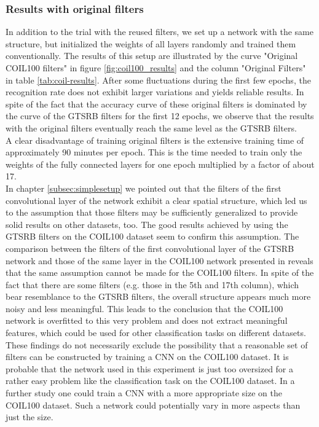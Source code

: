 \documentclass[11pt, a4paper]{article}
\begin{document}
\subsubsection{Results with original filters}

In addition to the trial with the reused filters, we set up a network with the same structure, but initialized the weights of all layers randomly and trained them conventionally. The results of this setup are illustrated by the curve "Original COIL100 filters" in figure \ref{fig:coil100_results} and the column "Original Filters" in table \ref{tab:coil-results}. After some fluctuations during the first few epochs, the recognition rate does not exhibit larger variations and yields reliable results. In spite of the fact that the accuracy curve of these original filters is dominated by the curve of the GTSRB filters for the first 12 epochs, we observe that the results with the original filters eventually reach the same level as the GTSRB filters.\\
A clear disadvantage of training original filters is the extensive training time of approximately 90 minutes per epoch. This is the time needed to train only the weights of the fully connected layers for one epoch multiplied by a factor of about 17.\\
In chapter \ref{subsec:simplesetup} we pointed out that the filters of the first convolutional layer of the  network exhibit a clear spatial structure, which led us to the assumption that those filters may be sufficiently generalized to provide solid results on other datasets, too. The good results achieved by using the GTSRB filters on the COIL100 dataset seem to confirm this assumption. The comparison between the filters of the first convolutional layer of the GTSRB network and those of the same layer in the COIL100 network presented in  reveals that the same assumption cannot be made for the COIL100 filters. In spite of the fact that there are some filters (e.g. those in the 5th and 17th column), which bear resemblance to the GTSRB filters, the overall structure appears much more noisy and less meaningful. This leads to the conclusion that the COIL100 network is overfitted to this very problem and does not extract meaningful features, which could be used for other classification tasks on different datasets. These findings do not necessarily exclude the possibility that a reasonable set of filters can be constructed by training a CNN on the COIL100 dataset. It is probable that the network used in this experiment is just too oversized for a rather easy problem like the classification task on the COIL100 dataset. In a further study one could train a CNN with a more appropriate size on the COIL100 dataset. Such a network could potentially vary in more aspects than just the size.\\
\end{document}

